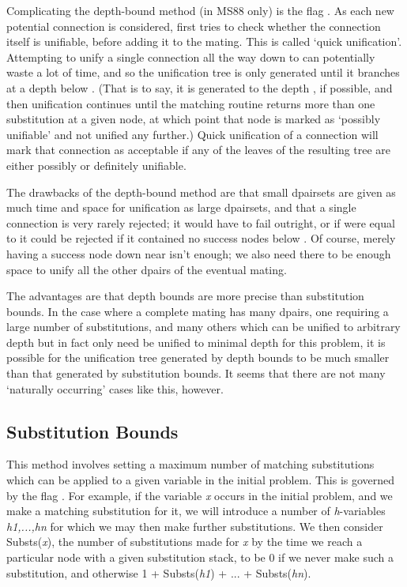 Complicating the depth-bound method (in MS88 only) is the flag . As each
new potential connection is considered, {\TPS} first tries to check whether the connection
itself is unifiable, before adding it to the mating. This is called `quick unification'.
Attempting to unify a single connection all the way down to 
can potentially waste a lot of time, and so the
unification tree is only generated until it branches at a depth below .
(That is to say, it is generated to the depth , if possible,
and then unification continues until the matching routine returns more than one substitution at a
given node, at which point that node is marked as `possibly unifiable' and not unified any further.)
Quick unification of a connection will mark that connection as acceptable if any of the leaves of
the resulting tree are either possibly or definitely unifiable.

The drawbacks of the depth-bound method are that small dpairsets are given as much time and space for
unification as large dpairsets, and that a single connection is very rarely rejected; it would have to
fail outright, or if  were equal to  it could be
rejected if it contained no success nodes below . Of course, merely having a
success node down near  isn't enough; we also need there to be enough space to
unify all the other dpairs of the eventual mating.

The advantages are that depth bounds are more precise than substitution bounds. In the case where a complete
mating has many dpairs, one requiring a large number of substitutions, and many others which can be unified to
arbitrary depth but in fact only need be unified to minimal depth for this problem, it is possible for
the unification tree generated by depth bounds to be much smaller than that generated by substitution bounds.
It seems that there are not many `naturally occurring' cases like this, however.

\subsection{Substitution Bounds}
This method involves setting a maximum number of matching substitutions which can be applied to
a given variable in the initial problem. This is governed by the flag .
For example, if the variable {\it x} occurs in the initial problem, and we make a matching substitution
for it, we will introduce a number of {\it h}-variables {\it h1,...,hn} for which we may then make further substitutions.
We then consider Substs({\it x}), the number of substitutions made for {\it x} by the time we reach a particular
node with a given substitution stack, to be 0 if we never make such a substitution, and
otherwise 1 + Substs({\it h1}) + ... + Substs({\it hn}).

